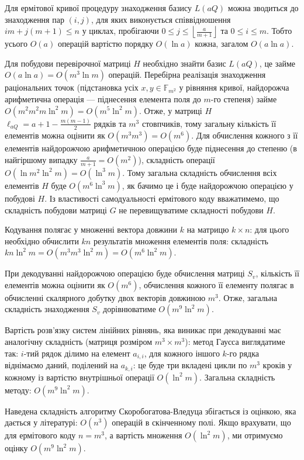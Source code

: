 \documentclass[a4paper,14pt,oneside]{extarticle}
\begin{document}
Для ермітової кривої процедуру знаходження базису $L(aQ)$ можна зводиться до знаходження пар $(i, j)$, для яких виконується співвідношення 
$i m + j (m + 1) \le n$ у циклах, пробігаючи $0 \le j \le \left \lfloor \frac{a}{m+1} \right \rfloor$ та $0 \le i \le m$. Тобто усього $O(a)$ операцій 
вартістю порядку $O(\ln a)$ кожна, загалом $O(a \ln a)$.

Для побудови перевірочної матриці $H$ необхідно знайти базис $L(aQ)$, це займе $O(a \ln a) = O(m^3 \ln m)$ операцій. 
Перебірна реалізація знаходження раціональних точок (підстановка усіх $x, y \in \mathbb{F}_{m^2}$ у рівняння кривої, найдорожча арифметична операція --- 
піднесення елемента поля до $m$-го степеня) займе $O(m^2 m^2 m \ln^2 m) = O(m^5 \ln^2 m)$. Отже, у матриці $H$ $\ell_{aQ}=a+1-\frac{m(m-1)}{2}$ рядків та 
$m^3$ стовпчиків, тому загальну кількість її елементів можна оцінити як $O(m^3 m^3) = O(m^6)$. Для обчислення кожного з її елементів найдорожчою 
арифметичною операцією буде піднесення до степеню (в найгіршому випадку $\frac{a}{m+1}=O(m^2)$), складність операції $O(\ln m^2 \ln^2 m) = O(\ln^3 m)$. 
Тому загальна складність обчислення всіх елементів $H$ буде $O(m^6 \ln^3 m)$, як бачимо це і буде найдорожчою операцією у побудові $H$. Із 
властивості самодуальності ермітового коду вважатимемо, що складність побудови матриці $G$ не перевищуватиме складності побудови $H$.

Кодування полягає у множенні вектора довжини $k$ на матрицю $k \times n$: для цього необхідно обчислити $k n$ результатів множення елементів поля: 
складність $k n \ln^2 m = O(m^3 m^3 \ln^2 m) = O(m^6 \ln^2 m)$.

При декодуванні найдорожчою операцією буде обчислення матриці $S_v$, кількість її елементів можна оцінити як $O(m^6)$, обчислення кожного її елементу полягає 
в обчисленні скалярного добутку двох векторів довжиною $m^3$. Отже, загальна складність знаходження $S_v$ дорівнюватиме $O(m^9 \ln^2 m)$.

Вартість розв'язку систем лінійних рівнянь, яка виникає при декодуванні має аналогічну складність (матриця розміром $m^3 \times m^3$): 
метод Гаусса виглядатиме так: $i$-тий рядок ділимо на елемент $a_{i,i}$, для кожного іншого $k$-го рядка віднімаємо даний, поділений на $a_{k,i}$:
це буде три вкладені цикли по $m^3$ кроків у кожному із вартістю внутрішньої операції $O(\ln^2 m)$. Загальна складність методу: $O(m^9 \ln^2 m)$.

Наведена складність алгоритму Скоробогатова-Вледуца збігається із оцінкою, яка дається у літературі: $O(n^3)$ операцій в скінченному полі. 
Якщо врахувати, що для ермітового коду $n=m^3$, а вартість множення $O(\ln^2 m)$, ми отримуємо оцінку $O(m^9 \ln^2 m)$.
\end{document}
